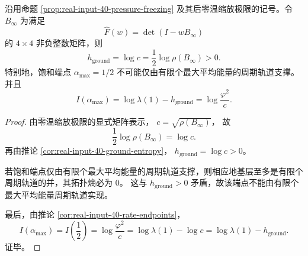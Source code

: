 \begin{theorem}[饱和端点由正熵地基层支配而非有限周期轨道]\label{thm:killo-real-input-40-positive-entropy-freezing}
沿用命题 \ref{prop:real-input-40-pressure-freezing} 及其后零温缩放极限的记号。令 \(B_\infty\) 为满足
\[
\widehat F(w)=\det(I-wB_\infty)
\]
的 \(4\times4\) 非负整数矩阵，则
\[
h_{\mathrm{ground}}
=
\log c
=
\frac12\log\rho(B_\infty)
>
0.
\]
特别地，饱和端点 \(\alpha_{\max}=1/2\) 不可能仅由有限个最大平均能量的周期轨道支撑。并且
\[
I(\alpha_{\max})
=
\log\lambda(1)-h_{\mathrm{ground}}
=
\log\frac{\varphi^2}{c}.
\]
\end{theorem}
\begin{proof}
由零温缩放极限的显式矩阵表示，
\(
c=\sqrt{\rho(B_\infty)}
\)，
故
\[
\frac12\log\rho(B_\infty)=\log c.
\]
再由推论 \ref{cor:real-input-40-ground-entropy}，
\(
h_{\mathrm{ground}}=\log c>0
\)。

若饱和端点仅由有限个最大平均能量的周期轨道支撑，则相应地基层至多是有限个周期轨道的并，其拓扑熵必为 \(0\)。
这与 \(h_{\mathrm{ground}}>0\) 矛盾，故该端点不能由有限个最大平均能量周期轨道实现。

最后，由推论 \ref{cor:real-input-40-rate-endpoints}，
\[
I(\alpha_{\max})
=
I\!\left(\frac12\right)
=
\log\frac{\varphi^2}{c}
=
\log\lambda(1)-\log c
=
\log\lambda(1)-h_{\mathrm{ground}}.
\]
证毕。
\end{proof}

\endinput
